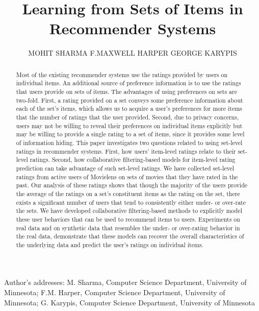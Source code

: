 \documentclass[prodmode,acmtiis]{acmsmall}
\newcommand*{\ML}{Movielens\xspace}
\begin{document}
\title{Learning from Sets of Items in Recommender Systems}

\author{MOHIT SHARMA
  F.MAXWELL HARPER
  GEORGE KARYPIS
}


\begin{abstract}
%
Most of the existing recommender systems use the ratings provided by users on
individual items.
An additional source of preference information is to use the ratings that users provide on sets of items.
The advantages of using preferences on sets are two-fold. First, a
rating provided on a set conveys some preference information about each of the
set's items, which allows us to acquire a user's preferences for more items that
the number of ratings that the user provided.
Second, due to
privacy concerns, users may not be willing to reveal their preferences on
individual items explicitly but may be willing to provide a single rating to a
set of items, since it provides some level of information hiding. This paper
investigates two questions related to using set-level ratings in
recommender systems. First, how users' item-level ratings relate to their
set-level ratings. Second, how collaborative filtering-based models for
item-level rating prediction can take advantage of such set-level ratings. 
We have collected set-level ratings from active users of \ML
on sets of movies that they have rated in the past. 
Our analysis of these ratings shows that though the majority of the users
provide the average of the ratings on a set's constituent items as the rating on
the set, there exists a significant number of users that tend to
consistently either under- or over-rate the sets.
We have developed collaborative filtering-based
methods to explicitly model these user behaviors that can be used to recommend
items to users. 
Experiments on real data and on synthetic data that resembles the under- or
over-rating behavior in the real data, demonstrate that these models can recover the
overall characteristics of the underlying data and predict the user's ratings on
individual items.


\end{abstract}





\begin{bottomstuff}
  Author's addresses:  M. Sharma, Computer Science Department,
  University of Minnesota; F.M. Harper, Computer Science Department, University of
  Minnesota; G. Karypis, Computer Science Department,
  University of Minnesota
\end{bottomstuff}
\end{document}
